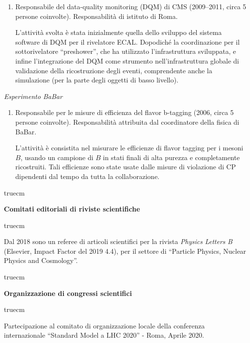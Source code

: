 \documentclass[11pt,twoside,a4paper]{article}
\begin{document}
\begin{enumerate}
    L'attivit\`a svolta \`e stata quella dell'installazione dei crate
    e schede dell'HV per gli APD di ECAL, della calibrazione e
    commissioning del sistema con i primi dati con i cosmici di CMS.
    Durante la prima presa dati \`e stato scoperto l'insorgere di un
    rumore di pick-up portato dai cavi ai supermoduli del
    calorimetro. Dopo aver individuato personalmente l'origine del
    rumore ho curato la campagna di modifica del grounding delle
    schede che ha permesso la rimozione di questo rumore.

  \item Responsabile del data-quality monitoring (DQM) di CMS
    (2009--2011, circa 5 persone coinvolte). Responsabilit\`a di
    istituto di Roma.

    L'attivit\`a svolta \`e stata inizialmente quella dello sviluppo
    del sistema software di DQM per il rivelatore ECAL. Dopodich\'e la
    coordinazione per il sottorivelatore ``preshower'', che ha
    utilizzato l'infrastruttura sviluppata, e infine l'integrazione
    del DQM come strumento nell'infrastruttura globale di validazione
    della ricostruzione degli eventi, comprendente anche la
    simulazione (per la parte degli oggetti di basso livello).
    
\end{enumerate}

\textit{Esperimento BaBar}
\begin{enumerate}
\item Responsabile per le misure di efficienza del flavor b-tagging
  (2006, circa 5 persone coinvolte). Responsabilit\`a attribuita dal
  coordinatore della fisica di BaBar.

  L'attivit\`a \`e consistita nel misurare le efficienze di flavor
  tagging per i mesoni $B$, usando un campione di $B$ in stati finali
  di alta purezza e completamente ricostruiti. Tali efficienze sono
  state usate dalle misure di violazione di CP dipendenti dal tempo da
  tutta la collaborazione.
\end{enumerate}

 truecm
\begin{center}
\textbf{Comitati editoriali di riviste scientifiche}
\end{center}
 truecm

Dal 2018 sono un referee di articoli scientifici per la rivista
\textit{Physics Letters B} (Elsevier, Impact Factor del 2019 4.4), per
il settore di ``Particle Physics, Nuclear Physics and Cosmology''.


 truecm
\begin{center}
\textbf{Organizzazione di congressi scientifici}
\end{center}
 truecm

Partecipazione al comitato di organizzazione locale della conferenza
internazionale ``Standard Model a LHC 2020'' - Roma, Aprile 2020. 
\end{document}
